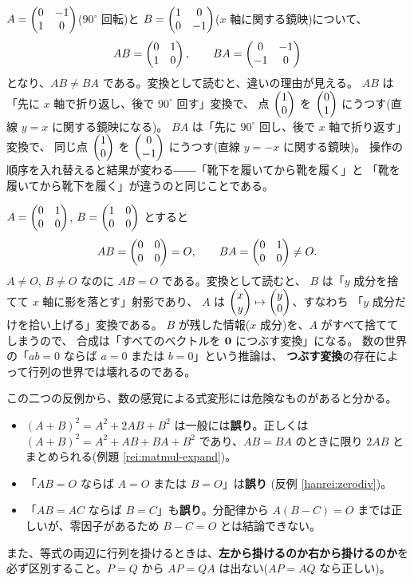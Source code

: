 \begin{hanrei}[積の順序は交換できない]\label{hanrei:noncommute}
$A = \begin{pmatrix}0 & -1 \\ 1 & 0\end{pmatrix}$($90^\circ$ 回転)と
$B = \begin{pmatrix}1 & 0 \\ 0 & -1\end{pmatrix}$($x$ 軸に関する鏡映)について、
\[
AB = \begin{pmatrix}0 & 1 \\ 1 & 0\end{pmatrix}, \qquad
BA = \begin{pmatrix}0 & -1 \\ -1 & 0\end{pmatrix}
\]
となり、$AB \neq BA$ である。変換として読むと、違いの理由が見える。
$AB$ は「先に $x$ 軸で折り返し、後で $90^\circ$ 回す」変換で、
点 $\begin{pmatrix}1 \\ 0\end{pmatrix}$ を $\begin{pmatrix}0 \\ 1\end{pmatrix}$ にうつす(直線 $y = x$ に関する鏡映になる)。
$BA$ は「先に $90^\circ$ 回し、後で $x$ 軸で折り返す」変換で、
同じ点 $\begin{pmatrix}1 \\ 0\end{pmatrix}$ を $\begin{pmatrix}0 \\ -1\end{pmatrix}$ にうつす(直線 $y = -x$ に関する鏡映)。
操作の順序を入れ替えると結果が変わる――「靴下を履いてから靴を履く」と
「靴を履いてから靴下を履く」が違うのと同じことである。
\end{hanrei}

\begin{hanrei}\label{hanrei:zerodiv}
$A = \begin{pmatrix}0 & 1 \\ 0 & 0\end{pmatrix}$, $B = \begin{pmatrix}1 & 0 \\ 0 & 0\end{pmatrix}$ とすると
\[
AB = \begin{pmatrix}0 & 0 \\ 0 & 0\end{pmatrix} = O, \qquad
BA = \begin{pmatrix}0 & 1 \\ 0 & 0\end{pmatrix} \neq O.
\]
$A \neq O$, $B \neq O$ なのに $AB = O$ である。変換として読むと、
$B$ は「$y$ 成分を捨てて $x$ 軸に影を落とす」射影であり、
$A$ は $\begin{pmatrix}x \\ y\end{pmatrix} \mapsto \begin{pmatrix}y \\ 0\end{pmatrix}$、すなわち
「$y$ 成分だけを拾い上げる」変換である。
$B$ が残した情報($x$ 成分)を、$A$ がすべて捨ててしまうので、
合成は「すべてのベクトルを $\bm{0}$ につぶす変換」になる。
数の世界の「$ab = 0$ ならば $a = 0$ または $b = 0$」という推論は、
\textbf{つぶす変換}の存在によって行列の世界では壊れるのである。
\end{hanrei}

\begin{chui}
この二つの反例から、数の感覚による式変形には危険なものがあると分かる。
\begin{itemize}
\item $(A + B)^2 = A^2 + 2AB + B^2$ は一般には\textbf{誤り}。正しくは
$(A + B)^2 = A^2 + AB + BA + B^2$ であり、$AB = BA$ のときに限り
$2AB$ とまとめられる(例題 \ref{rei:matmul-expand})。
\item 「$AB = O$ ならば $A = O$ または $B = O$」は\textbf{誤り}
(反例 \ref{hanrei:zerodiv})。
\item 「$AB = AC$ ならば $B = C$」も\textbf{誤り}。分配律から
$A(B - C) = O$ までは正しいが、零因子があるため $B - C = O$ とは結論できない。
\end{itemize}
また、等式の両辺に行列を掛けるときは、\textbf{左から掛けるのか右から掛けるのか}を
必ず区別すること。$P = Q$ から $AP = QA$ は出ない($AP = AQ$ なら正しい)。
\end{chui}

